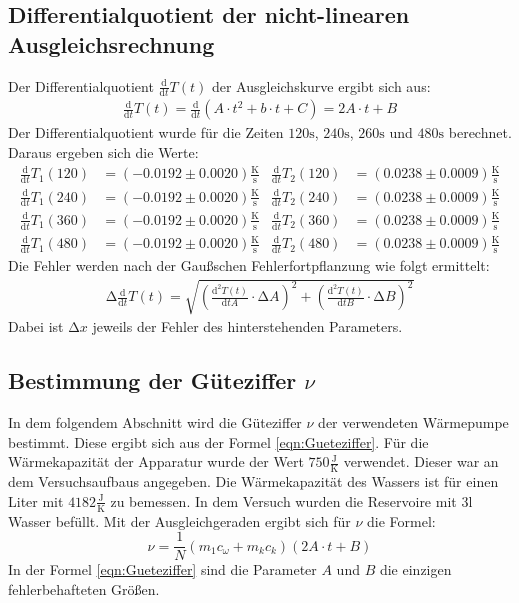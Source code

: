 \subsection{Differentialquotient der nicht-linearen Ausgleichsrechnung}
Der Differentialquotient $\frac{\mathup{d}}{\mathup{d}t} T(t)$ der Ausgleichskurve ergibt sich aus:
\begin{align*}
  \frac{\mathup{d}}{\mathup{d}t} T(t) = \frac{\mathup{d}}{\mathup{d}t}(A\cdot t^2 + b\cdot t + C) = 2 A\cdot t + B
\end{align*}
Der Differentialquotient wurde für die Zeiten $120 \si{\second}$, $240 \si{\second}$, $260 \si{\second}$ und $480 \si{\second}$ berechnet.
Daraus ergeben sich die Werte:
\begin{align*}
  \frac{\mathup{d}}{\mathup{d}t} T_1(120) & = (-0.0192 \pm 0.0020) \frac{\si{\kelvin}}{\si{\second}} &
  \frac{\mathup{d}}{\mathup{d}t} T_2(120) & = (0.0238 \pm 0.0009) \frac{\si{\kelvin}}{\si{\second}}    \\
  \frac{\mathup{d}}{\mathup{d}t} T_1(240) & = (-0.0192 \pm 0.0020) \frac{\si{\kelvin}}{\si{\second}} &
  \frac{\mathup{d}}{\mathup{d}t} T_2(240) & = (0.0238 \pm 0.0009) \frac{\si{\kelvin}}{\si{\second}}    \\
  \frac{\mathup{d}}{\mathup{d}t} T_1(360) & = (-0.0192 \pm 0.0020) \frac{\si{\kelvin}}{\si{\second}} &
  \frac{\mathup{d}}{\mathup{d}t} T_2(360) & = (0.0238 \pm 0.0009) \frac{\si{\kelvin}}{\si{\second}}    \\
  \frac{\mathup{d}}{\mathup{d}t} T_1(480) & = (-0.0192 \pm 0.0020) \frac{\si{\kelvin}}{\si{\second}} &
  \frac{\mathup{d}}{\mathup{d}t} T_2(480) & = (0.0238 \pm 0.0009) \frac{\si{\kelvin}}{\si{\second}}
\end{align*}
Die Fehler werden nach der Gaußschen Fehlerfortpflanzung wie folgt ermittelt:
\begin{align*}
  \increment\frac{\mathup{d}}{\mathup{d}t} T(t) = \sqrt{\left(\frac{\mathup{d^2}T(t)}{\mathup{d}tA}\cdot\increment A\right)^2 + \left(\frac{\mathup{d^2}T(t)}{\mathup{d}tB}\cdot\increment B\right)^2}
\end{align*}
Dabei ist $\increment x$ jeweils der Fehler des hinterstehenden Parameters.

\subsection{Bestimmung der Güteziffer \texorpdfstring{$\nu$}{z}}
In dem folgendem Abschnitt wird die Güteziffer $\nu$ der verwendeten Wärmepumpe bestimmt. Diese ergibt sich aus der Formel \eqref{eqn:Gueteziffer}. Für die Wärmekapazität der Apparatur wurde der Wert $750 \frac{\si{\joule}}{\si{\kelvin}}$ verwendet. Dieser war an dem Versuchsaufbaus angegeben. Die Wärmekapazität des Wassers ist für einen Liter mit $4182\frac{\si{\joule}}{\si{\kelvin}}$ zu bemessen. In dem Versuch wurden die Reservoire mit $3 \mathup{l}$ Wasser befüllt.
Mit der Ausgleichgeraden ergibt sich für $\nu$ die Formel:
\begin{equation}
  \label{eqn:Guete}
  \nu = \frac{1}{N}(m_1c_{\omega} + m_kc_k)(2 A\cdot t + B)
\end{equation}
In der Formel \eqref{eqn:Gueteziffer} sind die Parameter $A$ und $B$ die einzigen fehlerbehafteten Größen.

